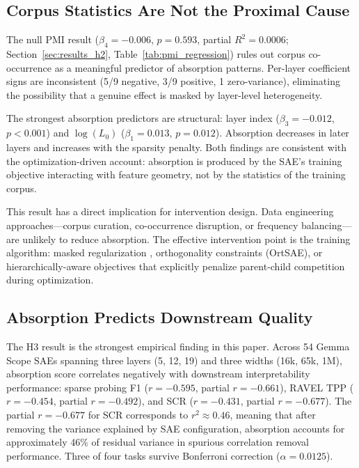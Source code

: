 \documentclass{article}
\begin{document}
\subsection{Corpus Statistics Are Not the Proximal Cause}

The null PMI result ($\beta_4 = -0.006$, $p = 0.593$, partial $R^2 = 0.0006$; Section~\ref{sec:results_h2}, Table~\ref{tab:pmi_regression}) rules out corpus co-occurrence as a meaningful predictor of absorption patterns. Per-layer coefficient signs are inconsistent (5/9 negative, 3/9 positive, 1 zero-variance), eliminating the possibility that a genuine effect is masked by layer-level heterogeneity.

The strongest absorption predictors are structural: layer index ($\beta_3 = -0.012$, $p < 0.001$) and $\log(L_0)$ ($\beta_1 = 0.013$, $p = 0.012$). Absorption decreases in later layers and increases with the sparsity penalty. Both findings are consistent with the optimization-driven account: absorption is produced by the SAE's training objective interacting with feature geometry, not by the statistics of the training corpus.

This result has a direct implication for intervention design. Data engineering approaches---corpus curation, co-occurrence disruption, or frequency balancing---are unlikely to reduce absorption. The effective intervention point is the training algorithm: masked regularization \citep{narayanaswamy2025masked}, orthogonality constraints (OrtSAE), or hierarchically-aware objectives that explicitly penalize parent-child competition during optimization.

\subsection{Absorption Predicts Downstream Quality}

The H3 result is the strongest empirical finding in this paper. Across 54 Gemma Scope SAEs spanning three layers (5, 12, 19) and three widths (16k, 65k, 1M), absorption score correlates negatively with downstream interpretability performance: sparse probing F1 ($r = -0.595$, partial $r = -0.661$), RAVEL TPP ($r = -0.454$, partial $r = -0.492$), and SCR ($r = -0.431$, partial $r = -0.677$). The partial $r = -0.677$ for SCR corresponds to $r^2 \approx 0.46$, meaning that after removing the variance explained by SAE configuration, absorption accounts for approximately 46\% of residual variance in spurious correlation removal performance. Three of four tasks survive Bonferroni correction ($\alpha = 0.0125$).
\end{document}
